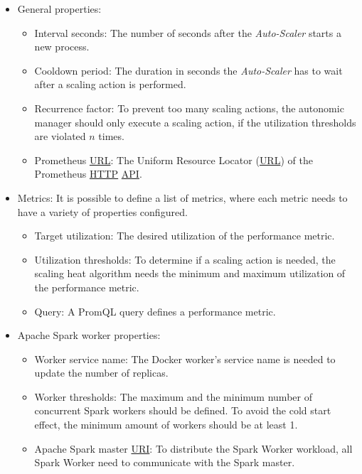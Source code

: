 \begin{itemize}
\item General properties:
\begin{itemize}
\item Interval seconds: The number of seconds after the \textit{Auto-Scaler} starts a new process.

\item Cooldown period: The duration in seconds the \textit{Auto-Scaler} has to wait after a scaling action is performed.

\item Recurrence factor: To prevent too many scaling actions,  the autonomic manager should only execute a scaling action,  if the utilization thresholds are violated $n$ times.

\item Prometheus \hyperlink{abbr:url}{URL}: The Uniform Resource Locator (\hyperlink{abbr:url}{URL}) of the Prometheus \hyperlink{abbr:http}{HTTP} \hyperlink{abbr:api}{API}.
\end{itemize}

\item Metrics:
It is possible to define a list of metrics, where each metric needs to have a variety of properties configured.
\begin{itemize}
\item Target utilization: The desired utilization of the performance metric.

\item Utilization thresholds: To determine if a scaling action is needed, the scaling heat algorithm needs the minimum and maximum utilization of the performance metric.

\item Query: A PromQL query defines a performance metric.
\end{itemize}

\item Apache Spark worker properties:
\begin{itemize}
\item Worker service name: The Docker worker's service name is needed to update the number of replicas.

\item Worker thresholds: The maximum and the minimum number of concurrent Spark workers should be defined. To avoid the cold start effect, the minimum amount of workers should be at least 1. 

\item Apache Spark master \hyperlink{abbr:uri}{URI}: To distribute the Spark Worker workload, all Spark Worker need to communicate with the Spark master.
\end{itemize}
\end{itemize}



